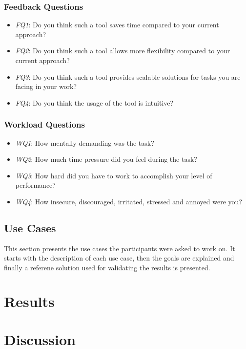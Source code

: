 \subsubsection*{Feedback Questions}

\begin{itemize}
    \item \textit{FQ1}: Do you think such a tool saves time compared to your current approach?
    \item \textit{FQ2}: Do you think such a tool allows more flexibility compared to your current approach?
    \item \textit{FQ3}: Do you think such a tool provides scalable solutions for tasks you are facing in your work?
    \item \textit{FQ4}: Do you think the usage of the tool is intuitive?
\end{itemize}

\subsubsection*{Workload Questions}

\begin{itemize}
    \item \textit{WQ1}: How mentally demanding was the task?
    \item \textit{WQ2}: How much time pressure did you feel during the task?
    \item \textit{WQ3}: How hard did you have to work to accomplish your level of performance?
    \item \textit{WQ4}: How insecure, discouraged, irritated, stressed and annoyed were you?
\end{itemize}

\subsection{Use Cases}
This section presents the use cases the participants were asked to work on. It starts with the description of each use case, then the goals are explained and finally a referene solution used for validating the results is presented.



\section{Results}

\section{Discussion}